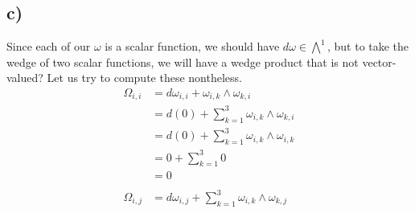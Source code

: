 \documentclass{article}
\theoremstyle{definition}
\begin{document}
\subsection*{c)}
Since each of our $\omega$ is a scalar function, we should have $d\omega \in \bigwedge^1$,
but to take the wedge of two scalar functions, we will have a wedge product that is not vector-valued?
Let us try to compute these nontheless.
\begin{align}
    \Omega_{i, i} & = d\omega_{i, i} + \omega_{i, k} \wedge \omega_{k, i} \\
    &= d (0) + \sum_{k = 1}^3 \omega_{i,k} \wedge \omega_{k,i} \\
    &= d(0) + \sum_{k = 1}^3 \omega_{i,k} \wedge \omega_{i,k} \\
    &= 0 + \sum_{k = 1}^3 0\\
    &= 0 \\\\
    \Omega_{i, j} & = d\omega_{i,j} + \sum_{k=1}^3\omega_{i,k}\wedge\omega_{k,j}\\
\end{align}
\end{document}

